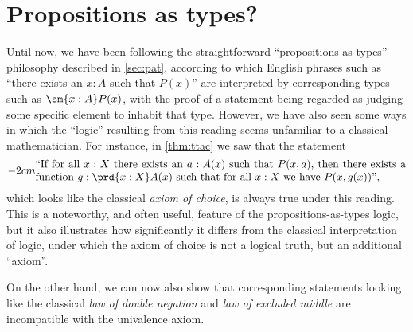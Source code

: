 %
%

\section{Propositions as types?}
\label{subsec:pat?}

%
%
%
Until now, we have been following the straightforward ``propositions as types'' philosophy described in \cref{sec:pat}, according to which English phrases such as ``there exists an $x:A$ such that $P(x)$'' are interpreted by corresponding types such as $\sm{x:A} P(x)$, with the proof of a statement being regarded as judging some specific element to inhabit that type.
However, we have also seen some ways in which the ``logic'' resulting from this reading seems unfamiliar to a classical mathematician.
For instance, in \cref{thm:ttac} we saw that the statement
%
\begin{equation}\label{eq:english-ac}
  \parbox{\textwidth-2cm}{``If for all $x:X$ there exists an $a:A(x)$ such that $P(x,a)$, then there exists a function $g:\prd{x:X} A(x)$ such that for all $x:X$ we have $P(x,g(x))$'',}
\end{equation}
which looks like the classical \emph{axiom of choice}, is always true under this reading. This is a noteworthy, and often useful, feature of the propositions-as-types logic, but it also illustrates how significantly it differs from the classical interpretation of logic, under which the axiom of choice is not a logical truth, but an additional ``axiom''.

On the other hand, we can now also show that corresponding statements looking like the classical \emph{law of double negation} and \emph{law of excluded middle} are incompatible with the univalence axiom.
%

